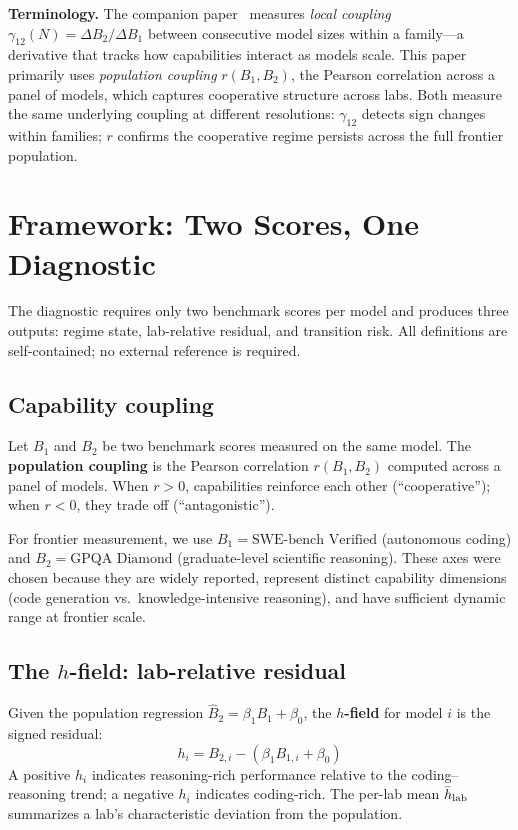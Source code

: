 \documentclass{article}
\begin{document}
\noindent\textbf{Terminology.}
The companion paper~\cite{amin2026lying} measures \emph{local coupling}
$\gamma_{12}(N) = \Delta B_2 / \Delta B_1$ between consecutive model sizes within a family---a
derivative that tracks how capabilities interact as models scale.
This paper primarily uses \emph{population coupling} $r(B_1, B_2)$, the Pearson
correlation across a panel of models, which captures cooperative structure across labs.
Both measure the same underlying coupling at different resolutions:
$\gamma_{12}$ detects sign changes within families;
$r$ confirms the cooperative regime persists across the full frontier population.

\section{Framework: Two Scores, One Diagnostic}
\label{sec:framework}

The diagnostic requires only two benchmark scores per model
and produces three outputs: regime state, lab-relative residual, and transition risk.
All definitions are self-contained; no external reference is required.

\subsection{Capability coupling}

Let $B_1$ and $B_2$ be two benchmark scores measured on the same model.
The \textbf{population coupling} is the Pearson correlation $r(B_1, B_2)$ computed
across a panel of models. When $r > 0$, capabilities reinforce each other
(``cooperative''); when $r < 0$, they trade off (``antagonistic'').

For frontier measurement, we use $B_1 = \text{SWE-bench Verified}$ (autonomous coding)
and $B_2 = \text{GPQA Diamond}$ (graduate-level scientific reasoning).
These axes were chosen because they are widely reported, represent distinct capability
dimensions (code generation vs.\ knowledge-intensive reasoning), and have sufficient
dynamic range at frontier scale.

\subsection{The \texorpdfstring{$h$}{h}-field: lab-relative residual}

Given the population regression $\hat{B}_2 = \beta_1 B_1 + \beta_0$, the \textbf{$h$-field}
for model $i$ is the signed residual:
\begin{equation}
  h_i = B_{2,i} - (\beta_1 B_{1,i} + \beta_0)
  \label{eq:hfield}
\end{equation}
A positive $h_i$ indicates reasoning-rich performance relative to the coding--reasoning trend;
a negative $h_i$ indicates coding-rich. The per-lab mean $\bar{h}_{\rm lab}$ summarizes
a lab's characteristic deviation from the population.
\end{document}
